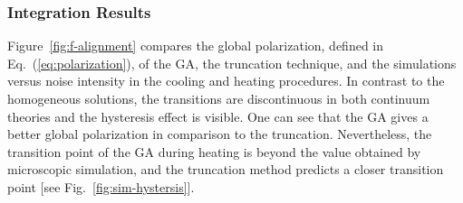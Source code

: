 \documentclass[reprint,floatfix,amsmath,amssymb,aps,pre,showkeys,showpacs,superscriptaddress]{revtex4-1}
\newcommand{\req}[1]{Eq.~(\ref{#1})}
\begin{document}
\subsubsection{Integration Results}

Figure~\ref{fig:f-alignment} compares the global polarization, defined in \req{eq:polarization}, of the GA, the truncation technique, and the simulations versus noise intensity in the cooling and heating procedures. In contrast to the homogeneous solutions, the transitions are discontinuous in both continuum theories and the hysteresis effect is visible. One can see that the GA gives a better global polarization in comparison to the truncation. Nevertheless, the transition point of the GA during heating is beyond the value obtained by microscopic simulation, and the truncation method predicts a closer transition point [see Fig.~\ref{fig:sim-hystersis}].
\end{document}
